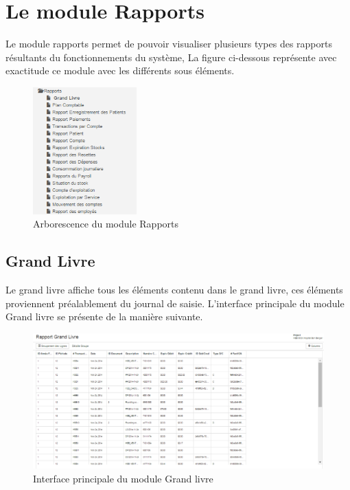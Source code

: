 \documentclass[12pt,a4paper]{report}
\begin{document}
\newpage
\chapter{Le module Rapports}        
Le module rapports permet de pouvoir visualiser plusieurs types des rapports résultants du fonctionnements du système, La figure ci-dessous représente avec exactitude ce module avec les différents sous éléments.

\begin{figure}[h]
\begin{center}
\includegraphics[width=4cm]{pic/ArboReport.png}
\end{center}
\caption{Arborescence du module Rapports}
\label{Arborescence du module Rapports}
\end{figure}
\newpage
\section{Grand Livre}
Le grand livre affiche tous les éléments contenu dans le grand livre, ces éléments proviennent préalablement du journal de saisie. L'interface principale du module Grand livre se présente de la manière suivante.


\begin{figure}[h]
\begin{center}
\includegraphics[width=13cm]{pic/GrandLivre.png}
\end{center}
\caption{Interface principale du module Grand livre}
\label{Interface principale du module Grand livre}
\end{figure}
\end{document}
